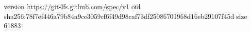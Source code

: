 version https://git-lfs.github.com/spec/v1
oid sha256:78f7ef446a79b84a9ce3059cf6f49d98caf73df25086701968d16eb29107f45d
size 61883

